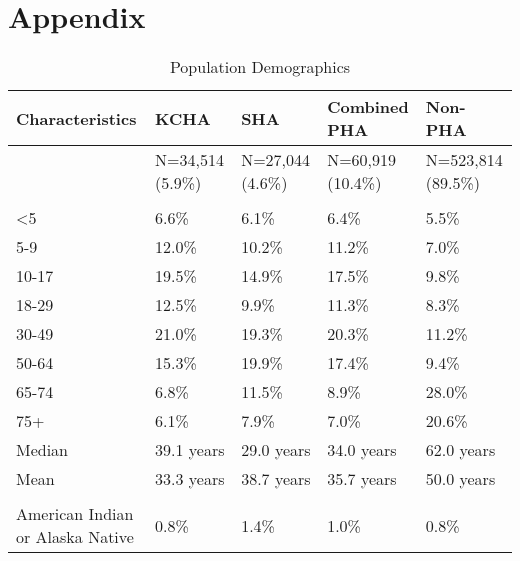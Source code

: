 \documentclass [11pt, proquest] {uwthesis}[2015/03/03]
\begin{document}
\appendix

\chapter*{Appendix}\label{appendix}
\begin{table}

\caption{\label{tab:table1}Population Demographics}
\centering
\fontsize{12}{14}\selectfont
\begin{tabu} to 
\toprule
Characteristics & KCHA & SHA & Combined PHA & Non-PHA\\
\midrule
 & N=34,514 (5.9\%) & N=27,044  (4.6\%) & N=60,919  (10.4\%) & N=523,814 (89.5\%)\\
\addlinespace[0.3em]
\\
\hspace{1em}<5 & 6.6\% & 6.1\% & 6.4\% & 5.5\%\\
\hspace{1em}5-9 & 12.0\% & 10.2\% & 11.2\% & 7.0\%\\
\hspace{1em}10-17 & 19.5\% & 14.9\% & 17.5\% & 9.8\%\\
\hspace{1em}18-29 & 12.5\% & 9.9\% & 11.3\% & 8.3\%\\
\hspace{1em}30-49 & 21.0\% & 19.3\% & 20.3\% & 11.2\%\\
\hspace{1em}50-64 & 15.3\% & 19.9\% & 17.4\% & 9.4\%\\
\hspace{1em}65-74 & 6.8\% & 11.5\% & 8.9\% & 28.0\%\\
\hspace{1em}75+ & 6.1\% & 7.9\% & 7.0\% & 20.6\%\\
\hspace{1em}Median & 39.1 years & 29.0 years & 34.0 years & 62.0 years\\
\hspace{1em}Mean & 33.3 years & 38.7 years & 35.7 years & 50.0 years\\
\addlinespace[0.3em]
\\
\hspace{1em}American Indian or Alaska Native & 0.8\% & 1.4\% & 1.0\% & 0.8\%\\

\end{tabu}
\end{table}
\end{document}
